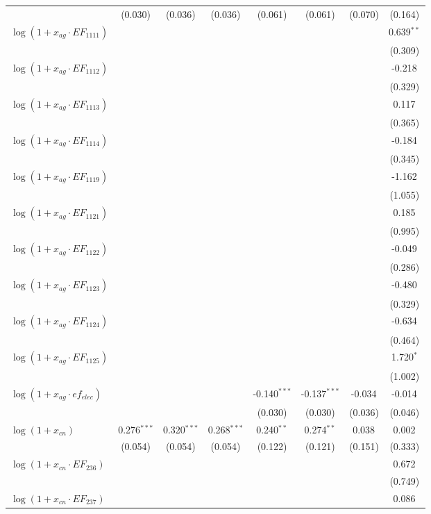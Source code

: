 \begin{longtable}[h]{lccccccc}
  & (0.030) & (0.036) & (0.036) & (0.061) & (0.061) & (0.070) & (0.164) \\
$\log(1 + x_{ag}\cdot EF_{1111})$ & & & & & & & 0.639$^{**}$ \\
  & & & & & & & (0.309) \\
$\log(1 + x_{ag}\cdot EF_{1112})$ & & & & & & & -0.218$^{}$ \\
  & & & & & & & (0.329) \\
$\log(1 + x_{ag}\cdot EF_{1113})$ & & & & & & & 0.117$^{}$ \\
  & & & & & & & (0.365) \\
$\log(1 + x_{ag}\cdot EF_{1114})$ & & & & & & & -0.184$^{}$ \\
  & & & & & & & (0.345) \\
$\log(1 + x_{ag}\cdot EF_{1119})$ & & & & & & & -1.162$^{}$ \\
  & & & & & & & (1.055) \\
$\log(1 + x_{ag}\cdot EF_{1121})$ & & & & & & & 0.185$^{}$ \\
  & & & & & & & (0.995) \\
$\log(1 + x_{ag}\cdot EF_{1122})$ & & & & & & & -0.049$^{}$ \\
  & & & & & & & (0.286) \\
$\log(1 + x_{ag}\cdot EF_{1123})$ & & & & & & & -0.480$^{}$ \\
  & & & & & & & (0.329) \\
$\log(1 + x_{ag}\cdot EF_{1124})$ & & & & & & & -0.634$^{}$ \\
  & & & & & & & (0.464) \\
$\log(1 + x_{ag}\cdot EF_{1125})$ & & & & & & & 1.720$^{*}$ \\
  & & & & & & & (1.002) \\
$\log(1 + x_{ag} \cdot ef_{elec})$ & & & & -0.140$^{***}$ & -0.137$^{***}$ & -0.034$^{}$ & -0.014$^{}$ \\
  & & & & (0.030) & (0.030) & (0.036) & (0.046) \\
$\log(1 + x_{cn})$ & 0.276$^{***}$ & 0.320$^{***}$ & 0.268$^{***}$ & 0.240$^{**}$ & 0.274$^{**}$ & 0.038$^{}$ & 0.002$^{}$ \\
  & (0.054) & (0.054) & (0.054) & (0.122) & (0.121) & (0.151) & (0.333) \\
$\log(1 + x_{cn}\cdot EF_{236})$ & & & & & & & 0.672$^{}$ \\
  & & & & & & & (0.749) \\
$\log(1 + x_{cn}\cdot EF_{237})$ & & & & & & & 0.086$^{}$ \\

\end{longtable}
